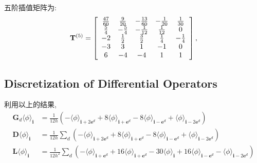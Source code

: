 \documentclass[12pt,halfline,a4paper]{ouparticle}
\begin{document}
五阶插值矩阵为:
$$
\mathbf{T}^{( 5 )}=\left[ \begin{array} {c c c c c} {{{\frac{4 7} {6 0}}}} & {{{\frac{9} {2 0}}}} & {{{-\frac{1 3} {6 0}}}} & {{{-\frac{1} {2 0}}}} & {{{\frac{1} {3 0}}}} \\ {{{\frac{5} {4}}}} & {{{-\frac{5} {4}}}} & {{{-\frac{1} {1 2}}}} & {{{\frac{1} {1 2}}}} & {{{0}}} \\ {{{-2}}} & {{\frac{1} {2}}} & {{\frac{3} {2}}} & {{{\frac{1} {4}}}} & {{{-\frac{1} {4}}}} \\ {{{-3}}} & {{3}} & {{1}} & {{{-1}}} & {{{0}}} \\ {{6}} & {{{-4}}} & {{{-4}}} & {{1}} & {{1}} \\ \end{array} \right], 
$$
\subsection{Discretization of Differential Operators}
利用以上的结果,
\begin{align}
    \mathbf{G}_{d}\langle\phi \rangle_{\mathbf{i}}&=\frac{1} {1 2 h} (-\langle\phi \rangle_{\mathbf{i}+2 \mathbf{e}^{d}}+8 \langle\phi \rangle_{\mathbf{i}+\mathbf{e}^{d}}-8 \langle\phi \rangle_{\mathbf{i}-\mathbf{e}^{d}}+\langle\phi \rangle_{\mathbf{i}-2 \mathbf{e}^{d}})\\
    \mathbf{D}\langle\phi \rangle_{\mathbf{i}}&=\frac{1} {1 2 h}\sum_{d} (-\langle\phi \rangle_{\mathbf{i}+2 \mathbf{e}^{d}}+8 \langle\phi \rangle_{\mathbf{i}+\mathbf{e}^{d}}-8 \langle\phi \rangle_{\mathbf{i}-\mathbf{e}^{d}}+\langle\phi \rangle_{\mathbf{i}-2 \mathbf{e}^{d}})\\
    \mathbf{L}\langle\phi \rangle_{\mathbf{i}}&=\frac{1} {1 2 h^2}\sum_{d} (-\langle\phi \rangle_{\mathbf{i}+ \mathbf{e}^{d}}+16 \langle\phi \rangle_{\mathbf{i}+\mathbf{e}^{d}} -  30 \langle\phi \rangle_{\mathbf{i}} + 16 \langle\phi \rangle_{\mathbf{i}-\mathbf{e}^{d}}-\langle\phi \rangle_{\mathbf{i}-2 \mathbf{e}^{d}})
\end{align}
\end{document}
